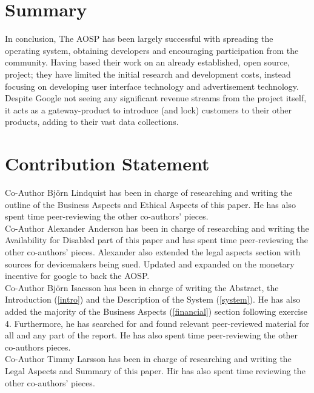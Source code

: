 \documentclass[conference]{IEEEtran}
\begin{document}
\section{Summary}
\label{summary}

In conclusion, The AOSP has been largely successful with spreading the operating system, obtaining developers and encouraging participation from the community. Having based their work on an already established, open source, project; they have limited the initial research and development costs, instead focusing on developing user interface technology and advertisement technology. Despite Google not seeing any significant revenue streams from the project itself, it acts as a gateway-product to introduce (and lock) customers to their other products, adding to their vast data collections.


\section{Contribution Statement}
\label{contribution}

Co-Author Björn Lindquist has been in charge of researching and writing the outline of the Business Aspects and Ethical Aspects of this paper. He has also spent time peer-reviewing the other co-authors' pieces.
\\Co-Author Alexander Anderson has been in charge of researching and writing the Availability for Disabled part of this paper and has spent time peer-reviewing the other co-authors' pieces. Alexander also extended the legal aspects section with sources for devicemakers being sued. Updated and expanded on the monetary incentive for google to back the AOSP.
\\Co-Author Björn Isacsson has been in charge of writing the Abstract, the Introduction (\ref{intro}) and the Description of the System (\ref{system}). He has also added the majority of the Business Aspects (\ref{financial}) section following exercise 4. Furthermore, he has searched for and found relevant peer-reviewed material for all and any part of the report. He has also spent time peer-reviewing the other co-authors pieces. 
\\Co-Author Timmy Larsson has been in charge of researching and writing the Legal Aspects and Summary of this paper. Hir has also spent time reviewing the other co-authors' pieces.
\end{document}
